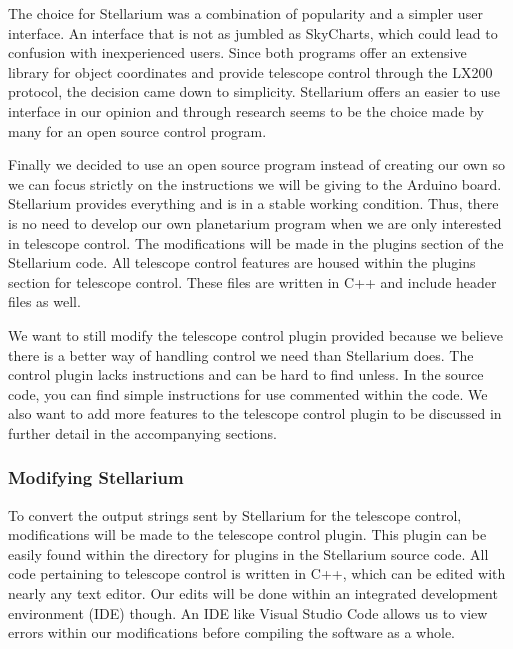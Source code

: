 \documentclass[12pt]{article}
\begin{document}
The choice for Stellarium was a combination of popularity and a simpler user interface. An interface that is not as jumbled as SkyCharts, which could lead to confusion with inexperienced users. Since both programs offer an extensive library for object coordinates and provide telescope control through the LX200 protocol, the decision came down to simplicity. Stellarium offers an easier to use interface in our opinion and through research seems to be the choice made by many for an open source control program.

Finally we decided to use an open source program instead of creating our own so we can focus strictly on the instructions we will be giving to the Arduino board. Stellarium provides everything and is in a stable working condition. Thus, there is no need to develop our own planetarium program when we are only interested in telescope control. The modifications will be made in the plugins section of the Stellarium code. All telescope control features are housed within the plugins section for telescope control. These files are written in C++ and include header files as well.

We want to still modify the telescope control plugin provided because we believe there is a better way of handling control we need than Stellarium does. The control plugin lacks instructions and can be hard to find unless. In the source code, you can find simple instructions for use commented within the code. We also want to add more features to the telescope control plugin to be discussed in further detail in the accompanying sections.

\subsubsection{Modifying Stellarium}

To convert the output strings sent by Stellarium for the telescope control, modifications will be made to the telescope control plugin. This plugin can be easily found within the directory for plugins in the Stellarium source code. All code pertaining to telescope control is written in C++, which can be edited with nearly any text editor. Our edits will be done within an integrated development environment (IDE) though. An IDE like Visual Studio Code allows us to view errors within our modifications before compiling the software as a whole.
\end{document}
